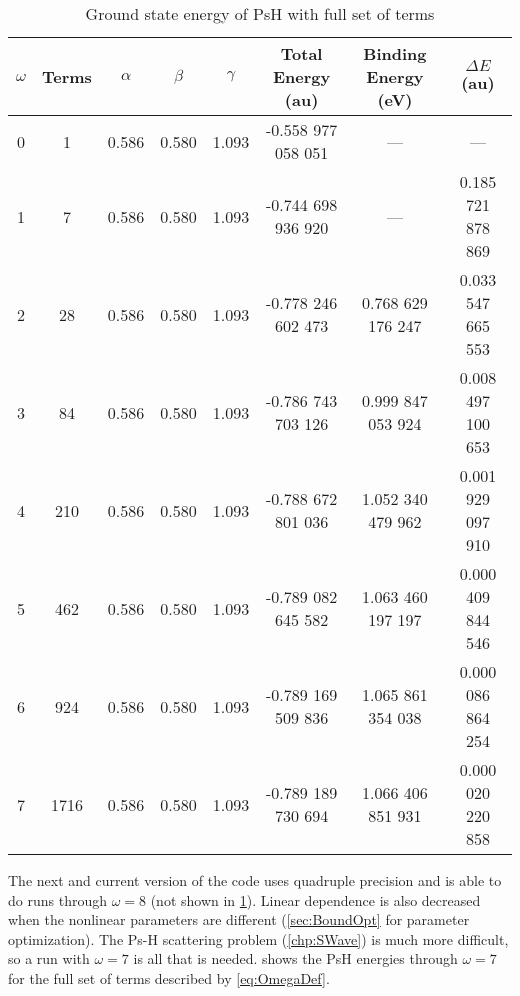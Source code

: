 \documentclass[Dissertation.tex]{subfiles}
\begin{document}
\setlength{\abovecaptionskip}{6pt}   %
\setlength{\belowcaptionskip}{6pt}   %
\begin{table}[H]
\small
\centering
\begin{tabular}{c c c c c c c c}
\toprule
$\omega$ & Terms & $\alpha$ & $\beta$ & $\gamma$ & Total Energy (au) & Binding Energy (eV) & $\Delta E$ (au) \\ [0.5ex]
\midrule
0 & 1    & 0.586 & 0.580 & 1.093 & -0.558 977 058 051 & --- & --- \\
1 & 7    & 0.586 & 0.580 & 1.093 & -0.744 698 936 920 & ---               & 0.185 721 878 869 \\
2 & 28   & 0.586 & 0.580 & 1.093 & -0.778 246 602 473 & 0.768 629 176 247 & 0.033 547 665 553 \\
3 & 84   & 0.586 & 0.580 & 1.093 & -0.786 743 703 126 & 0.999 847 053 924 & 0.008 497 100 653 \\
4 & 210  & 0.586 & 0.580 & 1.093 & -0.788 672 801 036 & 1.052 340 479 962 & 0.001 929 097 910 \\
5 & 462  & 0.586 & 0.580 & 1.093 & -0.789 082 645 582 & 1.063 460 197 197 & 0.000 409 844 546 \\
6 & 924  & 0.586 & 0.580 & 1.093 & -0.789 169 509 836 & 1.065 861 354 038 & 0.000 086 864 254 \\
7 & 1716 & 0.586 & 0.580 & 1.093 & -0.789 189 730 694 & 1.066 406 851 931 & 0.000 020 220 858 \\
\bottomrule
\end{tabular}
\caption{Ground state energy of PsH with full set of terms} %
\label{tab:BoundEnergy1}
\end{table}

The next and current version of the code uses quadruple precision and is able to do runs through $\omega = 8$ (not shown in \cref{tab:BoundEnergy1}). Linear dependence is also decreased when the nonlinear parameters are different (\cref{sec:BoundOpt} for parameter optimization). The Ps-H scattering problem (\cref{chp:SWave}) is much more difficult, so a run with $\omega = 7$ is all that is needed.  shows the PsH energies through $\omega = 7$ for the full set of terms described by \cref{eq:OmegaDef}.
\end{document}
